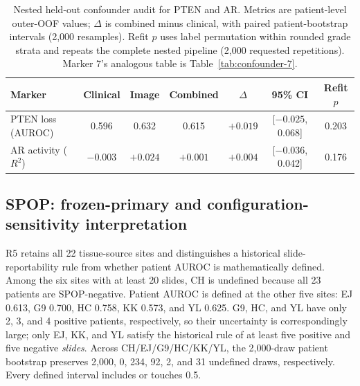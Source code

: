 \begin{table}[htbp]
\centering
\small
\begin{tabular}{lcccccc}
\toprule
Marker & Clinical & Image & Combined & $\Delta$ & 95\% CI & Refit $p$ \\
\midrule
PTEN loss (AUROC) & 0.596 & 0.632 & 0.615 & $+0.019$ & [$-0.025$, 0.068] & 0.203 \\
AR activity ($R^2$) & $-0.003$ & $+0.024$ & $+0.001$ & $+0.004$ & [$-0.036$, 0.042] & 0.176 \\
\bottomrule
\end{tabular}
\caption{Nested held-out confounder audit for PTEN and AR. Metrics are patient-level outer-OOF
values; $\Delta$ is combined minus clinical, with paired patient-bootstrap intervals (2{,}000
resamples). Refit $p$ uses label permutation within rounded grade strata and repeats the
complete nested pipeline (2{,}000 requested repetitions). Marker 7's analogous table is
Table~\ref{tab:confounder-7}.}
\label{tab:confounder-4-6}
\end{table}

\subsection{SPOP: frozen-primary and configuration-sensitivity interpretation}

R5 retains all 22 tissue-source sites and distinguishes a historical slide-reportability rule
from whether patient AUROC is mathematically defined. Among the six sites with at least 20
slides, CH is undefined because all 23 patients are SPOP-negative. Patient AUROC is defined at
the other five sites: EJ 0.613, G9 0.700, HC 0.758, KK 0.573, and YL 0.625. G9, HC, and YL
have only 2, 3, and 4 positive patients, respectively, so their uncertainty is correspondingly
large; only EJ, KK, and YL satisfy the historical rule of at least five positive and five
negative \emph{slides}. Across CH/EJ/G9/HC/KK/YL, the 2,000-draw patient bootstrap preserves
2,000, 0, 234, 92, 2, and 31 undefined draws, respectively. Every defined interval includes
or touches 0.5.

